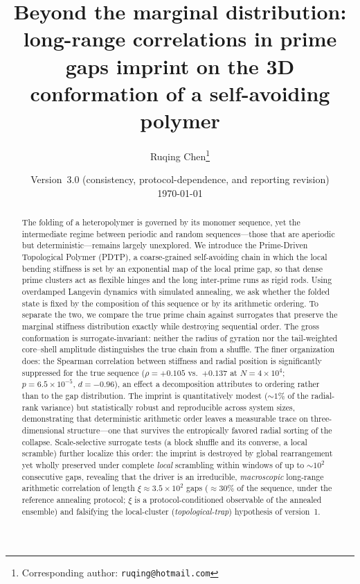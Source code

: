 \documentclass[11pt]{article}
\title{\bfseries Beyond the marginal distribution: long-range correlations in
prime gaps imprint on the 3D conformation of a self-avoiding polymer}
\author[1]{Ruqing Chen\thanks{Corresponding author: \texttt{ruqing@hotmail.com}}}
\affil[1]{GUT Geoservice Inc., Montreal, Quebec, Canada}
\date{\normalsize Version~3.0 (consistency, protocol-dependence, and reporting revision)\\[3pt]\today}
\begin{document}
\maketitle

\begin{abstract}
The folding of a heteropolymer is governed by its monomer sequence, yet the
intermediate regime between periodic and random sequences---those that are
aperiodic but deterministic---remains largely unexplored. We introduce the
Prime-Driven Topological Polymer (PDTP), a coarse-grained self-avoiding chain in
which the local bending stiffness is set by an exponential map of the local prime
gap, so that dense prime clusters act as flexible hinges and the long inter-prime
runs as rigid rods. Using overdamped Langevin dynamics with simulated annealing,
we ask whether the folded state is fixed by the composition of this sequence or by
its arithmetic ordering. To separate the two, we compare the true prime chain
against surrogates that preserve the marginal stiffness distribution exactly while
destroying sequential order. The gross conformation is surrogate-invariant:
neither the radius of gyration nor the tail-weighted core--shell amplitude
distinguishes the true chain from a shuffle. The finer organization does: the
Spearman correlation between stiffness and radial position is significantly
suppressed for the true sequence ($\rho = +0.105$ vs.\ $+0.137$ at
$N = 4\times10^{4}$; $p = 6.5\times10^{-5}$, $d = -0.96$), an effect a
decomposition attributes to ordering rather than to the gap distribution. The
imprint is quantitatively modest ($\sim\!1\%$ of the radial-rank variance) but
statistically robust and reproducible across system sizes, demonstrating that
deterministic arithmetic order leaves a measurable trace on three-dimensional
structure---one that survives the entropically favored radial sorting of the
collapse. Scale-selective surrogate tests (a block shuffle and its converse, a
local scramble) further localize this order: the imprint is destroyed by global
rearrangement yet wholly preserved under complete \emph{local} scrambling within
windows of up to ${\sim}10^{2}$ consecutive gaps, revealing that the driver is an
irreducible, \emph{macroscopic} long-range arithmetic correlation of length
$\xi \approx 3.5\times10^{2}$ gaps (${\approx}30\%$ of the sequence, under the
reference annealing protocol; $\xi$ is a protocol-conditioned observable of the
annealed ensemble) and falsifying the local-cluster (\emph{topological-trap})
hypothesis of version~1.
\end{abstract}
\end{document}
